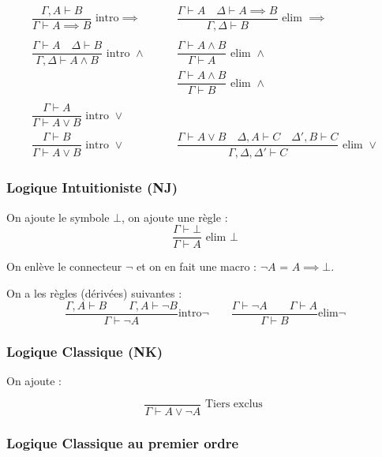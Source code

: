 \documentclass[french]{article}
\begin{document}
\begin{align*}
\dfrac{\Gamma ,A\vdash B}{\Gamma\vdash A\implies B} \text{ intro} \implies &\qquad 
\dfrac{\Gamma\vdash A \quad \Delta\vdash A\implies B}{\Gamma ,\Delta\vdash B} \text{ elim }\implies \\ 
\\
\dfrac{\Gamma\vdash A \quad \Delta \vdash B}{\Gamma, \Delta \vdash A\land B} \text{ intro } \land  &\qquad 
\dfrac{\Gamma\vdash A \land B}{\Gamma \vdash A} \text{ elim }\land \\
&\qquad \dfrac{\Gamma\vdash A \land B}{\Gamma \vdash B} \text{ elim }\land  \\
\\
\dfrac{\Gamma\vdash A}{\Gamma \vdash A \lor B} \text{ intro }\lor &\qquad \\
\dfrac{\Gamma\vdash B}{\Gamma \vdash A \lor B} \text{ intro }\lor 
&\qquad \dfrac{\Gamma\vdash A \lor B \quad \Delta,A \vdash C \quad \Delta',B \vdash C}{\Gamma, \Delta, \Delta' \vdash C} \text{ elim }\lor 
\end{align*}

\subsubsection{Logique Intuitioniste (NJ)}

On ajoute le symbole $\bot$, on ajoute une règle :
\[\dfrac{\Gamma\vdash\bot}{\Gamma\vdash A}\text{ elim }\bot\]

On enlève le connecteur $\neg$ et on en fait une macro : $\neg A$ = $A\implies\bot$.

On a les règles (dérivées) suivantes :
$$\frac{\Gamma, A\vdash B\qquad \Gamma, A\vdash\neg B}{\Gamma\vdash\neg A}\text{intro}\neg\qquad \frac{\Gamma\vdash\neg A\qquad \Gamma\vdash A}{\Gamma\vdash B}\text{elim}\neg$$


\subsubsection{Logique Classique (NK)}

On ajoute : 

\[\dfrac{}{\Gamma\vdash A\vee\neg A}\text{ Tiers exclus }\]

\subsubsection{Logique Classique au premier ordre}
\end{document}
